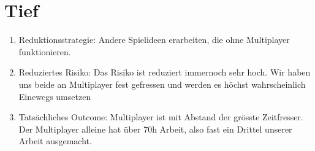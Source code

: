 \section{Tief}
\begin{enumerate}
    \item Reduktionsstrategie: Andere Spielideen erarbeiten, die ohne Multiplayer funktionieren.
    \item Reduziertes Risiko: Das Risiko ist reduziert immernoch sehr hoch.
          Wir haben uns beide an Multiplayer fest gefressen und werden es höchst wahrscheinlich Einewegs umsetzen
    \item Tatsächliches Outcome: Multiplayer ist mit Abstand der grösste Zeitfresser.
          Der Multiplayer alleine hat über 70h Arbeit, also fast ein Drittel unserer Arbeit ausgemacht.
% 
% 
% 
\end{enumerate}